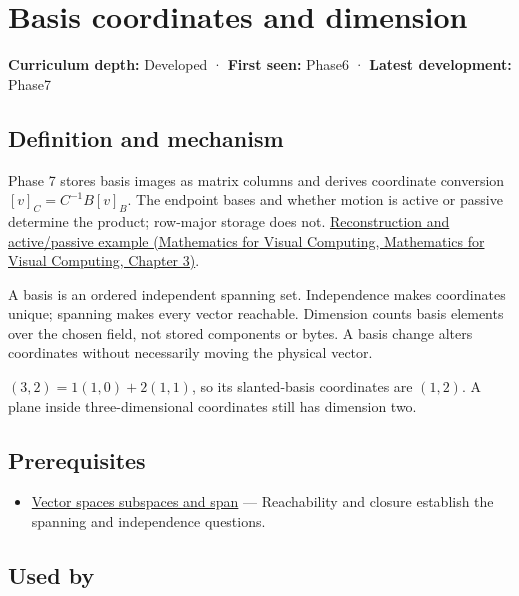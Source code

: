\hypertarget{appendix-ce0341f7ea0d}{}\label{referencestart:appendix-ce0341f7ea0d}
\section{Basis coordinates and dimension}\label{appendix-ce0341f7ea0d-basis-coordinates-and-dimension}

\textbf{Curriculum depth:} Developed · \textbf{First seen:} Phase6 · \textbf{Latest development:} Phase7

\subsection{Definition and mechanism}\label{appendix-ce0341f7ea0d-definition-and-mechanism}

Phase 7 stores basis images as matrix columns and derives coordinate conversion \([v]_C=C^{-1}B[v]_B\). The endpoint bases and whether motion is active or passive determine the product; row-major storage does not. \href{../02-Mathematics-for-Visual-Computing/main.pdf\#nameddest=01-foundations-i-ch019-coordinates-can-change-while-the-geometric-object-stays-still}{Reconstruction and active/passive example (Mathematics for Visual Computing, Mathematics for Visual Computing, Chapter 3)}.

A basis is an ordered independent spanning set. Independence makes coordinates unique; spanning makes every vector reachable. Dimension counts basis elements over the chosen field, not stored components or bytes. A basis change alters coordinates without necessarily moving the physical vector.

\((3,2)=1(1,0)+2(1,1)\), so its slanted-basis coordinates are \((1,2)\). A plane inside three-dimensional coordinates still has dimension two.

\subsection{Prerequisites}\label{appendix-ce0341f7ea0d-prerequisites}

\begin{itemize}
\tightlist
\item
  \hyperref[appendix-173b52c063ae]{Vector spaces subspaces and span} --- Reachability and closure establish the spanning and independence questions.
\end{itemize}

\subsection{Used by}\label{appendix-ce0341f7ea0d-used-by}


